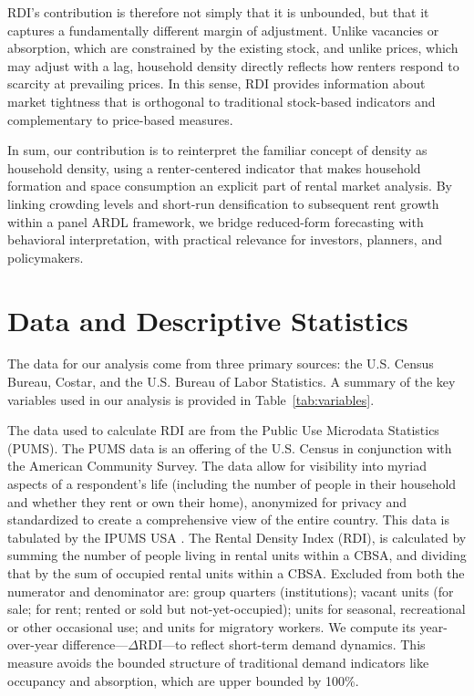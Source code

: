 \documentclass[pdflatex,sn-apa]{sn-jnl}%
\theoremstyle{thmstyleone}%
\theoremstyle{thmstyletwo}%
\theoremstyle{thmstylethree}%
\begin{document}
RDI's contribution is therefore not simply that it is unbounded, but that it captures a
fundamentally different margin of adjustment. Unlike vacancies or absorption, which
are constrained by the existing stock, and unlike prices, which may adjust with a lag,
household density directly reflects how renters respond to scarcity at prevailing prices.
In this sense, RDI provides information about market tightness that is orthogonal to
traditional stock-based indicators and complementary to price-based measures.

In sum, our contribution is to reinterpret the familiar concept of density as household
density, using a renter-centered indicator that makes household formation and space
consumption an explicit part of rental market analysis. By linking crowding levels and
short-run densification to subsequent rent growth within a panel ARDL framework, we
bridge reduced-form forecasting with behavioral interpretation, with practical relevance
for investors, planners, and policymakers.



\section{Data and Descriptive Statistics}\label{section3}
The data for our analysis come from three primary sources: the U.S. Census Bureau, Costar, and the U.S. Bureau of Labor Statistics. A summary of the key variables used in our analysis is provided in Table~\ref{tab:variables}.

The data used to calculate RDI are from the Public Use Microdata Statistics (PUMS). The PUMS data is an offering of the U.S. Census in conjunction with the American Community Survey. The data allow for visibility into myriad aspects of a respondent's life (including the number of people in their household and whether they rent or own their home), anonymized for privacy and standardized to create a comprehensive view of the entire country. This data is tabulated by the IPUMS USA \cite{ruggles2025ipums}. The Rental Density Index (RDI), is calculated by summing the number of people living in rental units within a CBSA, and dividing that by the sum of occupied rental units within a CBSA. Excluded from both the numerator and denominator are: group quarters (institutions); vacant units (for sale; for rent; rented or sold but not-yet-occupied); units for seasonal, recreational or other occasional use; and units for migratory workers. We compute its year-over-year difference---\(\Delta\text{RDI}\)---to reflect short-term demand dynamics. This measure avoids the bounded structure of traditional demand indicators like occupancy and absorption, which are upper bounded by 100\%. 
\end{document}
